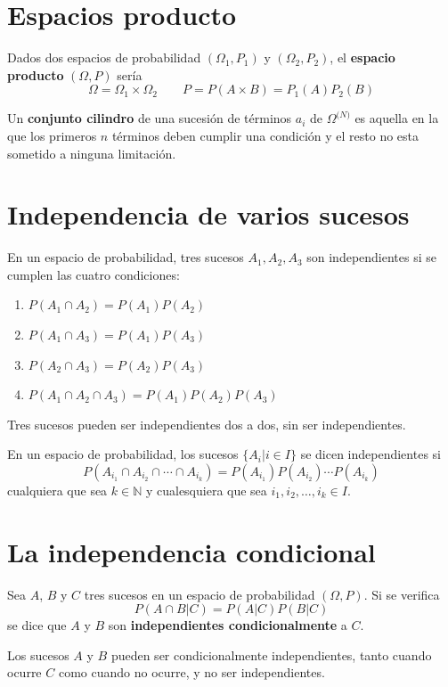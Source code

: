\documentclass[12pt,a4paper,twoside]{memoir}
\theoremstyle{mystyle}
\begin{document}
\section{Espacios producto} 

Dados dos espacios de probabilidad \((\Omega_1,P_1)\) y \((\Omega_2, P_2)\), el \textbf{espacio producto} \((\Omega,P)\) sería 
\[
\Omega = \Omega_1 \times \Omega_2 \qquad P=P(A \times B) = P_1(A)P_2(B)
\]

Un \textbf{conjunto cilindro} de una sucesión de términos \(a_i\) de \(\Omega^{\mathbb(N)}\) es aquella en la que los primeros \(n\) términos
deben cumplir una condición y el resto no esta sometido a ninguna limitación. 

\section{Independencia de varios sucesos} 

En un espacio de probabilidad, tres sucesos \(A_1, A_2, A_3\) son independientes si se cumplen las cuatro condiciones:
\begin{enumerate}
  \item \(P(A_1 \cap A_2) = P(A_1)P(A_2)\)
  \item \(P(A_1 \cap A_3) = P(A_1)P(A_3)\) 
  \item \(P(A_2 \cap A_3) = P(A_2)P(A_3)\)
  \item \(P(A_1 \cap A_2 \cap A_3) = P(A_1)P(A_2)P(A_3)\)
\end{enumerate} 

Tres sucesos pueden ser independientes dos a dos, sin ser independientes.

En un espacio de probabilidad, los sucesos \(\{A_i | i \in I\}\) se dicen independientes si 
\[
P(A_{i_1} \cap A_{i_2} \cap \cdots \cap A_{i_k})= P(A_{i_1})P(A_{i_2}) \cdots P(A_{i_k})
\]
cualquiera que sea \(k \in \mathbb{N}\) y cualesquiera que sea \(i_1, i_2,\ldots, i_k \in I\). 


\section{La independencia condicional} 

Sea \(A\), \(B\) y \(C\) tres sucesos en un espacio de probabilidad \((\Omega,P)\). Si se verifica 
\[
P(A \cap B|C) = P(A|C)P(B|C)
\] se dice que \(A\) y \(B\) son \textbf{independientes condicionalmente} a \(C\).

Los sucesos \(A\) y \(B\) pueden ser condicionalmente independientes, tanto cuando ocurre \(C\) como cuando no ocurre, y no ser independientes.
\end{document}
